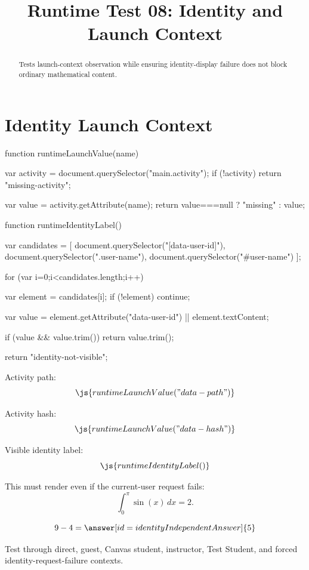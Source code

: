 \documentclass{ximera}
\title{Runtime Test 08: Identity and Launch Context}
\begin{document}
\begin{abstract}
Tests launch-context observation while ensuring identity-display failure does
not block ordinary mathematical content.
\end{abstract}
\maketitle

\section{Identity Launch Context}


\begin{javascript}
function runtimeLaunchValue(name) {
  var activity = document.querySelector("main.activity");
  if (!activity)
    return "missing-activity";

  var value = activity.getAttribute(name);
  return value===null ? "missing" : value;
}

function runtimeIdentityLabel() {
  var candidates = [
    document.querySelector("[data-user-id]"),
    document.querySelector(".user-name"),
    document.querySelector("#user-name")
  ];

  for (var i=0;i<candidates.length;i++) {
    var element = candidates[i];
    if (!element)
      continue;

    var value =
      element.getAttribute("data-user-id") ||
      element.textContent;

    if (value && value.trim())
      return value.trim();
  }

  return "identity-not-visible";
}
\end{javascript}

Activity path:
\[
\js{runtimeLaunchValue("data-path")}
\]

Activity hash:
\[
\js{runtimeLaunchValue("data-hash")}
\]

Visible identity label:
\[
\js{runtimeIdentityLabel()}
\]

This must render even if the current-user request fails:
\[
\int_0^\pi\sin(x)\,dx=2.
\]

\begin{problem}
\[
9-4=\answer[id=identityIndependentAnswer]{5}
\]
\end{problem}

Test through direct, guest, Canvas student, instructor, Test Student, and forced
identity-request-failure contexts.
\end{document}
